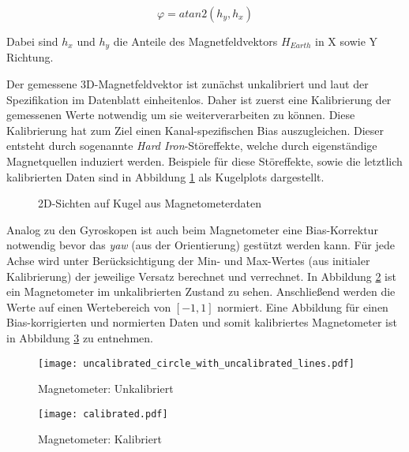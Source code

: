 \begin{equation}
    \varphi = atan2(h_y,h_x)
\end{equation}

Dabei sind $h_x$ und $h_y$ die Anteile des Magnetfeldvektors $H_{Earth}$ in X sowie Y Richtung.

Der gemessene 3D-Magnetfeldvektor ist zunächst unkalibriert und laut der Spezifikation im Datenblatt  einheitenlos.
Daher ist zuerst eine Kalibrierung der gemessenen Werte notwendig um sie weiterverarbeiten zu können. 
Diese Kalibrierung hat zum Ziel einen Kanal-spezifischen Bias auszugleichen. 
Dieser entsteht durch sogenannte \textit{Hard Iron}-Störeffekte, welche durch eigenständige Magnetquellen induziert werden.
Beispiele für diese Störeffekte, sowie die letztlich kalibrierten Daten sind in Abbildung \ref{fig:mag_kugel_plots} als Kugelplots dargestellt.

\begin{figure}[ht]
\centering
{}

\caption[]{2D-Sichten auf Kugel aus Magnetometerdaten}
\label{fig:mag_kugel_plots}
\end{figure}


Analog zu den Gyroskopen ist auch beim Magnetometer eine Bias-Korrektur notwendig bevor das \emph{yaw} (aus der Orientierung) gestützt werden kann. Für jede Achse wird unter Berücksichtigung der Min- und Max-Wertes (aus initialer Kalibrierung) der jeweilige Versatz berechnet und verrechnet. In Abbildung \ref{fig:mag_uncalibrated} ist ein Magnetometer im unkalibrierten Zustand zu sehen. Anschließend werden die Werte auf einen Wertebereich von ${[-1, 1]}$ normiert. Eine Abbildung für einen Bias-korrigierten und normierten Daten und somit kalibriertes Magnetometer ist in Abbildung \ref{fig:mag_calibrated} zu entnehmen.       


\begin{figure}[h]
   \centering
   \texttt{[image: uncalibrated\_circle\_with\_uncalibrated\_lines.pdf]}
   \caption[a]{Magnetometer: Unkalibriert}
   \label{fig:mag_uncalibrated}
\end{figure}

\begin{figure}[]
   \centering
   \texttt{[image: calibrated.pdf]}
   \caption[]{Magnetometer: Kalibriert}
   \label{fig:mag_calibrated}
\end{figure}


